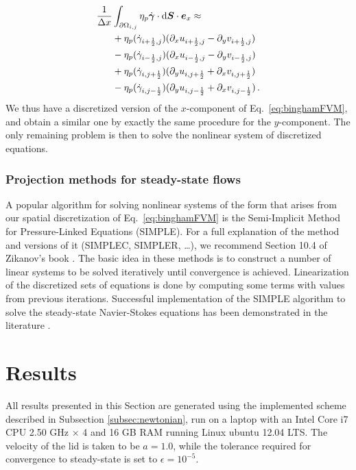 \documentclass[final,3p,twocolumn]{elsarticle}
\begin{document}
\begin{align}
    \nonumber 
    \frac{1}{\Delta x} &\int_{\partial \Omega_{i,j}} \eta_p \dot{\bm{\gamma}}
    \cdot {\rm d}\bm{S} \cdot \bm{e}_x \approx \\ 
    \nonumber 
    &+ \eta_p (\dot{\gamma}_{i+\frac{1}{2},j}) (\partial_x
    u_{i+\frac{1}{2},j} - \partial_y v_{i+\frac{1}{2},j}) \\
    \nonumber 
    &- \eta_p (\dot{\gamma}_{i-\frac{1}{2},j}) (\partial_x
    u_{i-\frac{1}{2},j} - \partial_y v_{i-\frac{1}{2},j}) \\
    \nonumber 
    &+ \eta_p (\dot{\gamma}_{i,j+\frac{1}{2}}) (\partial_y
    u_{i,j+\frac{1}{2}} + \partial_x v_{i,j+\frac{1}{2}}) \\
    &- \eta_p (\dot{\gamma}_{i,j-\frac{1}{2}}) (\partial_y
    u_{i,j-\frac{1}{2}} + \partial_x v_{i,j-\frac{1}{2}}) \,.
\end{align}
%
We thus have a discretized version of the $x$-component of Eq.\
\eqref{eq:binghamFVM}, and obtain a similar one by exactly the same procedure
for the $y$-component. The only remaining problem is then to solve the
nonlinear system of discretized equations. 

\subsubsection{Projection methods for steady-state flows}

A popular algorithm for solving nonlinear systems of the form that arises from
our spatial discretization of Eq.\ \eqref{eq:binghamFVM} is the Semi-Implicit
Method for Pressure-Linked Equations (SIMPLE). For a full explanation of the
method and versions of it (SIMPLEC, SIMPLER, \ldots), we recommend Section 10.4
of Zikanov's book \cite{zikanov2010essential}. The basic idea in these methods
is to construct a number of linear systems to be solved iteratively until
convergence is achieved. Linearization of the discretized sets of equations is
done by computing some terms with values from previous iterations.  Successful
implementation of the SIMPLE algorithm to solve the steady-state Navier-Stokes
equations has been demonstrated in the literature \cite{syrakos2013solution}.

\section{Results}
\label{sec:results}

All results presented in this Section are generated using the implemented
scheme described in Subsection \ref{subsec:newtonian}, run on a laptop with an
Intel Core i7 CPU \@ 2.50 GHz $\times$ 4 and 16 GB RAM running Linux ubuntu
12.04 LTS. The velocity of the lid is taken to be $a=1.0$, while the tolerance
required for convergence to steady-state is set to $\epsilon=10^{-5}$. 
\end{document}
